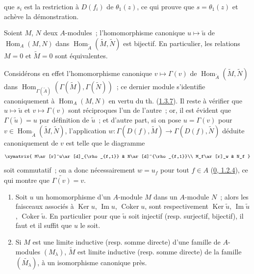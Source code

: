 que $s_i$ est la restriction à $D(f_i)$ de $\theta_1(z)$, ce qui prouve que
$s=\theta_1(z)$ et achève la démonstration.

\begin{corollary}[1.3.8]
\label{I.1.3.8-fr}
Soient $M$, $N$ deux $A$-modules~; l'homomorphisme canonique
$u\mapsto\widetilde{u}$ de $\operatorname{Hom}_A(M,N)$ dans
$\operatorname{Hom}_{\widetilde{A}}(\widetilde{M},\widetilde{N})$ est
bijectif. En particulier, les relations $M=0$ et $\widetilde{M}=0$ sont
équivalentes.
\end{corollary}

Considérons en effet l'homomorphisme canonique $v\mapsto\Gamma(v)$ de
$\operatorname{Hom}_{\widetilde{A}}(\widetilde{M},\widetilde{N})$ dans
$\operatorname{Hom}_{\Gamma(\widetilde{A})}
(\Gamma(\widetilde{M}),\Gamma(\widetilde{N}))$~; ce dernier module s'identifie
canoniquement à $\operatorname{Hom}_A(M,N)$ en vertu du th.
(\hyperref[I.1.3.7-fr]{1.3.7}). Il reste à vérifier que
$u\mapsto\widetilde{u}$ et $v\mapsto\Gamma(v)$ sont réciproques l'un de
l'autre~; or, il est évident que $\Gamma(\widetilde{u})=u$ par définition de
$\widetilde{u}$~; et d'autre part, si on pose $u=\Gamma(v)$ pour
$v\in\operatorname{Hom}_{\widetilde{A}}(\widetilde{M},\widetilde{N})$,
l'application
$w:\Gamma(D(f),\widetilde{M})\to\Gamma(D(f),\widetilde{N})$ déduite
canoniquement de $v$ est telle que le diagramme
\[
  \xymatrix{
    M\ar[r]^u\ar[d]_{\rho_{f,1}} & N\ar[d]^{\rho_{f,1}}\\
    M_f\ar[r]_w & N_f
  }
\]
soit commutatif~; on a donc nécessairement $w=u_f$ pour tout $f\in A$
(\hyperref[0.1.2.4-fr]{0, 1.2.4}), ce qui montre que
$\widetilde{\Gamma(v)}=v$.

\begin{corollary}[1.3.9]
\label{I.1.3.9-fr}
\begin{enumerate}
  \item[\rm(i)] Soit $u$ un homomorphisme d'un $A$-module $M$ dans un
  $A$-module $N$~; alors les faisceaux associés à $\operatorname{Ker}u$,
  $\operatorname{Im}u$, $\operatorname{Coker}u$, sont respectivement
  $\operatorname{Ker}\widetilde{u}$, $\operatorname{Im}\widetilde{u}$,
  $\operatorname{Coker}\widetilde{u}$. En particulier pour que
  $\widetilde{u}$ soit injectif (resp. surjectif, bijectif), il faut et il
  suffit que $u$ le soit.
  \item[\rm(ii)] Si $M$ est une limite inductive (resp. somme directe) d'une
  famille de $A$-modules $(M_\lambda)$, $\widetilde{M}$ est limite inductive
  (resp. somme directe) de la famille $(\widetilde{M_\lambda})$, à un
  isomorphisme canonique près.
\end{enumerate}
\end{corollary}

